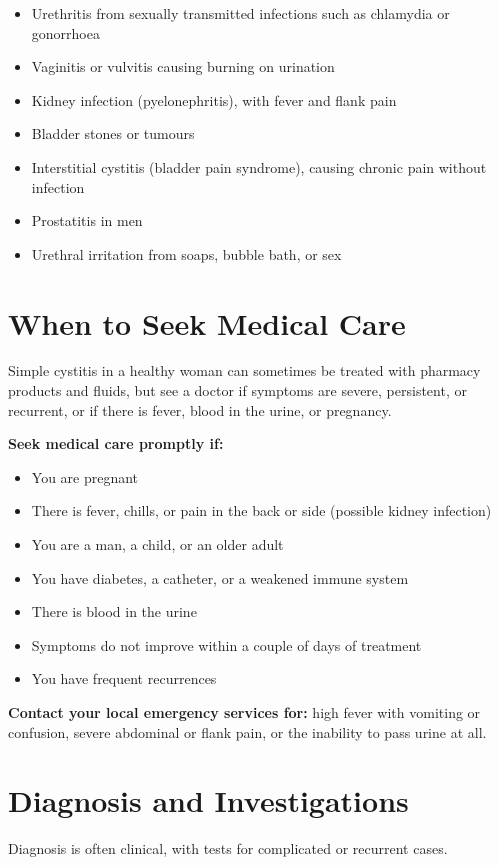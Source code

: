 \begin{itemize}
    \item Urethritis from sexually transmitted infections such as chlamydia or gonorrhoea
    \item Vaginitis or vulvitis causing burning on urination
    \item Kidney infection (pyelonephritis), with fever and flank pain
    \item Bladder stones or tumours
    \item Interstitial cystitis (bladder pain syndrome), causing chronic pain without infection
    \item Prostatitis in men
    \item Urethral irritation from soaps, bubble bath, or sex
\end{itemize}

\section*{When to Seek Medical Care}
Simple cystitis in a healthy woman can sometimes be treated with pharmacy products and fluids, but see a doctor if symptoms are severe, persistent, or recurrent, or if there is fever, blood in the urine, or pregnancy.

\textbf{Seek medical care promptly if:}
\begin{itemize}
    \item You are pregnant
    \item There is fever, chills, or pain in the back or side (possible kidney infection)
    \item You are a man, a child, or an older adult
    \item You have diabetes, a catheter, or a weakened immune system
    \item There is blood in the urine
    \item Symptoms do not improve within a couple of days of treatment
    \item You have frequent recurrences
\end{itemize}

\textbf{Contact your local emergency services for:} high fever with vomiting or confusion, severe abdominal or flank pain, or the inability to pass urine at all.

\section*{Diagnosis and Investigations}
Diagnosis is often clinical, with tests for complicated or recurrent cases.

